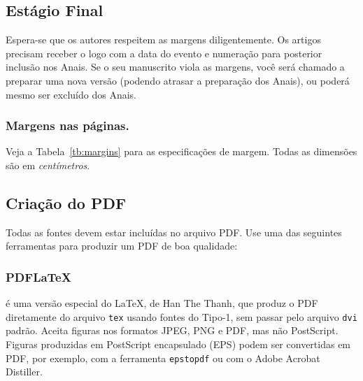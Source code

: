 \subsection{Estágio Final}

Espera-se que os autores respeitem as margens diligentemente. 
Os artigos precisam receber o logo com a data do evento e numeração para
posterior inclusão nos Anais. Se o seu manuscrito viola as margens, você será
chamado a preparar uma nova versão (podendo atrasar a preparação dos Anais), ou 
poderá mesmo ser excluído dos Anais. 


\subsubsection{Margens nas páginas.} Veja a Tabela~\ref{tb:margins} 
para as especificações de margem. Todas as dimensões são em 
\emph{centímetros}.


\subsection{Criação do PDF}

Todas as fontes devem estar incluídas no arquivo PDF. Use uma das seguintes
ferramentas para produzir um PDF de boa qualidade: 

\subsubsection{PDFLaTeX} 
é uma versão especial do \LaTeX, de Han The
Thanh, que produz o PDF diretamente do arquivo \texttt{tex} usando fontes do Tipo-1,
sem passar pelo arquivo \texttt{dvi} padrão. Aceita figuras nos formatos JPEG, PNG e PDF,
mas não PostScript. Figuras produzidas em PostScript encapsulado (EPS) podem
ser convertidas em PDF, por exemplo, com a ferramenta \texttt{epstopdf} ou
com o Adobe Acrobat
Distiller.



